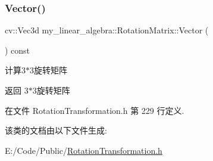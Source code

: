 \subsubsection{\texorpdfstring{Vector()}{Vector()}}
{\footnotesize\ttfamily cv\+::\+Vec3d my\+\_\+linear\+\_\+algebra\+::\+Rotation\+Matrix\+::\+Vector (\begin{DoxyParamCaption}{ }\end{DoxyParamCaption}) const\hspace{0.3cm}{\ttfamily [inline]}}



计算3$\ast$3旋转矩阵 

\begin{DoxyReturn}{返回}
3$\ast$3旋转矩阵 
\end{DoxyReturn}


在文件 Rotation\+Transformation.\+h 第 229 行定义.



该类的文档由以下文件生成\+:\begin{DoxyCompactItemize}
\item 
E\+:/\+Code/\+Public/\mbox{\hyperlink{_rotation_transformation_8h}{Rotation\+Transformation.\+h}}\end{DoxyCompactItemize}
